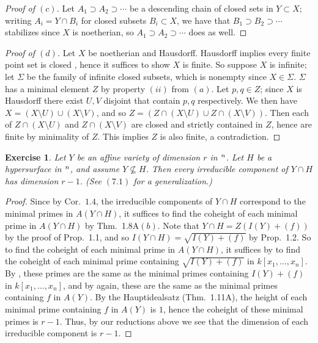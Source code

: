 \documentclass[12pt,letterpaper]{article}
\newtheorem{problem}{Exercise}[section]
\theoremstyle{definition}
\theoremstyle{remark}
\numberwithin{equation}{section}
\numberwithin{figure}{problem}
\let\AA\relax
\DeclareMathOperator{\AA}{\mathbb{A}}
\begin{document}
\begin{proof}[Proof of $(c)$]
  Let $A_1 \supset A_2 \supset \cdots$ be a descending chain of closed sets
  in $Y \subset X$; writing $A_i = Y \cap B_i$ for closed subsets
  $B_i \subset X$, we have that $B_1 \supset B_2 \supset \cdots$ stabilizes
  since $X$ is noetherian, so $A_1 \supset A_2 \supset \cdots$ does as well.
\end{proof}
\begin{proof}[Proof of $(d)$]
  Let $X$ be noetherian and Hausdorff.
  Hausdorff implies every finite point set is closed \cite[Thm.~17.8]{Mun00},
  hence it suffices to show $X$ is finite.
  So suppose $X$ is infinite; let $\Sigma$ be the family of infinite closed
  subsets, which is nonempty since $X \in \Sigma$.
  $\Sigma$ has a minimal element $Z$ by property $(ii)$ from $(a)$.
  Let $p,q \in Z$; since $X$ is Hausdorff there exist $U,V$ disjoint that
  contain $p,q$ respectively.
  We then have $X = (X \setminus U) \cup (X \setminus V)$, and so
  $Z = (Z \cap (X \setminus U) \cup Z\cap(X \setminus V))$.
  Then each of $Z \cap (X \setminus U)$ and $Z \cap (X \setminus V)$ are
  closed and strictly contained in $Z$, hence are finite by minimality of $Z$.
  This implies $Z$ is also finite, a contradiction.
\end{proof}

\begin{problem}\label{exc:1.8}
  Let $Y$ be an affine variety of dimension $r$ in $\AA^n$.
  Let $H$ be a hypersurface in $\AA^n$, and assume $Y \not\subseteq H$.
  Then every irreducible component of $Y \cap H$ has dimension $r-1$.
  (See $(7.1)$ for a generalization.)
\end{problem}
\begin{proof}
  Since by Cor.~$1.4$, the irreducible components of $Y \cap H$ correspond to
  the minimal primes in $A(Y \cap H)$, it suffices to find the coheight of each
  minimal prime in $A(Y \cap H)$ by Thm.~1.8A$(b)$.
  Note that $Y \cap H = Z(I(Y) + (f))$ by the proof of Prop.~1.1, and so
  $I(Y \cap H) = \sqrt{I(Y) + (f)}$ by Prop.~1.2.
  So to find the coheight of each minimal prime in $A(Y \cap H)$, it suffices by
  \cite[Prop.~1.1]{AM69} to find the coheight of each minimal prime containing
  $\sqrt{I(Y) + (f)}$ in $k[x_1,\ldots,x_n]$.
  By \cite[Prop.~1.14]{AM69}, these primes are the same as the minimal primes
  containing $I(Y) + (f)$ in $k[x_1,\ldots,x_n]$, and by \cite[Prop.~1.1]{AM69}
  again, these are the same as the minimal primes containing $f$ in $A(Y)$.
  By the Hauptidealsatz (Thm.~1.11A), the height of each minimal prime
  containing $f$ in $A(Y)$ is $1$, hence the coheight of these minimal primes is
  $r-1$.
  Thus, by our reductions above we see that the dimension of each irreducible
  component is $r-1$.
\end{proof}
\end{document}
